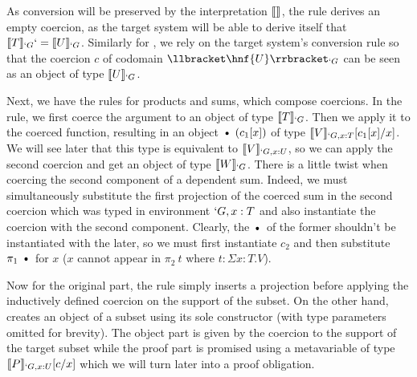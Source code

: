 \documentclass{llncs}
\begin{document}
As conversion will be preserved by the interpretation $\llbracket  \rrbracket_{}$,
the rule  derives an empty coercion, as the target system
will be able to derive itself that $\llbracket T \rrbracket_{`G} `= \llbracket U \rrbracket_{`G}$.
Similarly for , we rely on the target system's conversion
rule so that the coercion $c$ of codomain $\ip{\hnf{U}}{`G}$ can be seen
as an object of type $\llbracket U \rrbracket_{`G}$.

Next, we have the rules for products and sums, which compose
coercions. In the  rule, we first coerce the argument to
an object of type $\llbracket T \rrbracket_{`G}$. Then we apply it to the coerced
function, resulting in an object $\ctxdot~(c_1[x])$ of type
$\llbracket V \rrbracket_{`G, x : T}[c_1[x]/x]$. We will see later that this type is equivalent to
$\llbracket V \rrbracket_{`G, x : U}$, so we can apply the second coercion and get an
object of type $\llbracket W \rrbracket_{`G}$. There is a little twist when coercing the
second component of a dependent sum. Indeed, we must simultaneously
substitute the first projection of the coerced sum in the second
coercion which was typed in environment $`G, x : T$ and also instantiate
the coercion with the second component. Clearly, the $\ctxdot$ of the
former shouldn't be instantiated with the later, so we must first
instantiate $c_2$ and then substitute $\pi_1~\ctxdot$ for $x$ 
($x$ cannot appear in $\pi_2~t$ where $t : \Sigma x : T.V$).

Now for the original part, the  rule simply inserts a
projection before applying the inductively defined coercion on the
support of the subset. On the other hand,  creates an
object of a subset using its sole constructor  (with type
parameters omitted for brevity). The object
part is given by the coercion to the support of the target subset
while the proof part is promised using a metavariable of type $\llbracket P \rrbracket_{`G, x : U}[c/x]$ which
we will turn later into a proof obligation. 
\end{document}
